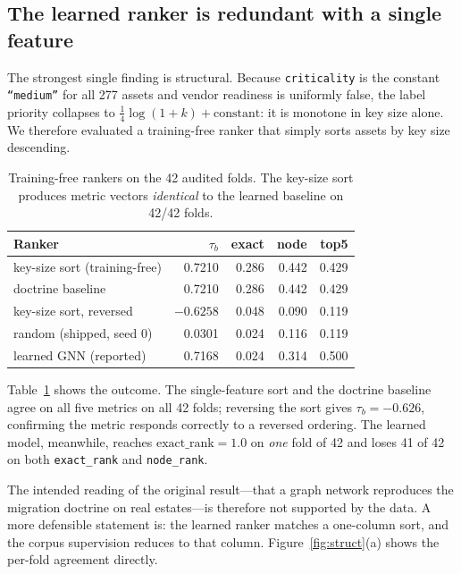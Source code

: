 \documentclass[conference]{IEEEtran}
\newcommand{\code}[1]{\texttt{\small #1}}
\begin{document}
\subsection{The learned ranker is redundant with a single feature}

\label{sec:redundant}

The strongest single finding is structural. Because \code{criticality} is the constant
\code{``medium''} for all 277 assets and vendor readiness is uniformly false, the label
priority collapses to $\frac{1}{4}\log(1+k)+\text{constant}$: it is monotone in key size
alone. We therefore evaluated a training-free ranker that simply sorts assets by key size
descending.

\begin{table}[t]
\centering
\caption{Training-free rankers on the 42 audited folds. The key-size sort produces metric
vectors \emph{identical} to the learned baseline on 42/42 folds.}
\label{tab:baselines}
\begin{tabular}{@{}lrrrr@{}}
\toprule
\textbf{Ranker} & $\tau_b$ & exact & node & top5 \\
\midrule
key-size sort (training-free) & 0.7210 & 0.286 & 0.442 & 0.429 \\
doctrine baseline & 0.7210 & 0.286 & 0.442 & 0.429 \\
key-size sort, reversed & $-0.6258$ & 0.048 & 0.090 & 0.119 \\
random (shipped, seed 0) & 0.0301 & 0.024 & 0.116 & 0.119 \\
learned GNN (reported) & 0.7168 & 0.024 & 0.314 & 0.500 \\
\bottomrule
\end{tabular}
\end{table}

Table~\ref{tab:baselines} shows the outcome. The single-feature sort and the doctrine
baseline agree on all five metrics on all 42 folds; reversing the sort gives
$\tau_b=-0.626$, confirming the metric responds correctly to a reversed ordering. The
learned model, meanwhile, reaches $\mathrm{exact\_rank}=1.0$ on \emph{one} fold of 42 and
loses 41 of 42 on both \code{exact\_rank} and \code{node\_rank}.

The intended reading of the original result---that a graph network reproduces the
migration doctrine on real estates---is therefore not supported by the data. A more
defensible statement is: the learned ranker matches a one-column sort, and the corpus
supervision reduces to that column. Figure~\ref{fig:struct}(a) shows the per-fold
agreement directly.
\end{document}
